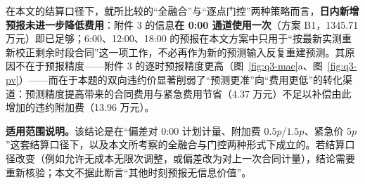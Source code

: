 在本文的结算口径下，就所比较的``全融合''与``逐点门控''两种策略而言，\textbf{日内新增预报未进一步降低费用}：附件 3 的信息\textbf{在 0:00 通道使用一次}（方案 B1，1345.71 万元）即已足够；6:00、12:00、18:00 的预报在本文方案中只用于``按最新实测重新校正剩余时段合同''这一项工作，不必再作为新的预测输入反复重建预测。其原因不在于预报精度——附件 3 的逐时预报精度更高（图~\ref{fig:q3-mae}a、图~\ref{fig:q3-pv}）——而在于本题的双向违约价显著削弱了``预测更准''向``费用更低''的转化渠道：预测精度提高带来的合同费用与紧急费用节省（4.37 万元）不足以补偿由此增加的违约附加费（13.96 万元）。

\textbf{适用范围说明。}该结论是在``偏差对 0:00 计划计量、附加费 $0.5p$/$1.5p$、紧急价 $5p$''这套结算口径下，以及本文所考察的全融合与门控两种形式下成立的。若结算口径改变（例如允许无成本无限次调整，或偏差改为对上一次合同计量），结论需要重新核验；本文不据此断言``其他时刻预报无信息价值''。
